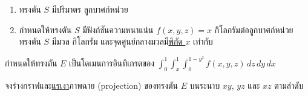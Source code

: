 \documentclass[12pt,final]{novelette} %
\begin{document}
\begin{question}
\begin{question}
\begin{enumerate}[label=(\alph*),itemsep=15pt,topsep=5pt]
            \item ทรงตัน $S$ มีปริมาตร \ansboxs ลูกบาศก์หน่วย

                  \bigskip
            \item กำหนดให้ทรงตัน $S$ มีฟังก์ชันความหนาแน่น $f(x, y, z) = x$ กิโลกรัมต่อลูกบาศก์หน่วย \\[.5em]
                  ทรงตัน $S$ มีมวล \ansboxs กิโลกรัม และจุดศูนย์กลางมวลมี\uline{พิกัด $x$} เท่ากับ \ansboxs
        \end{enumerate}
    \end{question}

    \pagebreak

    \item {} %
     กำหนดให้ทรงตัน $E$ เป็นโดเมนการอินทิเกรตของ $\displaystyle\int_0^1\int_x^1\int_0^{1-y^2} f(x, y, z) \, dz \, dy \, dx$
    \begin{question}
        \item จงร่างกราฟและ\uline{แรเงา}ภาพฉาย (projection) ของทรงตัน $E$ บนระนาบ $xy$, $yz$ และ $xz$ ตามลำดับ


\end{question}
\end{question}
\end{document}
